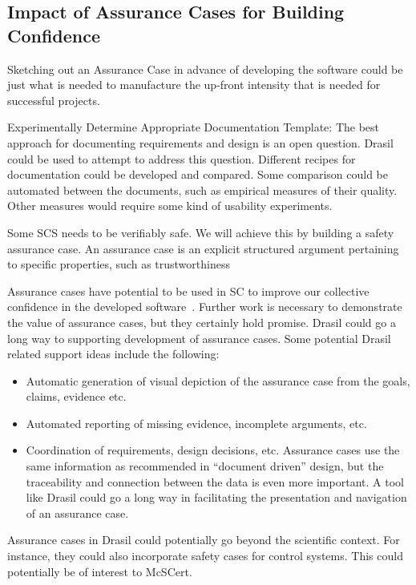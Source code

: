 \documentclass[12pt]{article}
\begin{document}
\subsection{Impact of Assurance Cases for Building
  Confidence} \label{SecAssuranceCase}

Sketching out an Assurance Case in advance of developing the software could be
just what is needed to manufacture the up-front intensity that is needed for
successful projects.

Experimentally Determine Appropriate Documentation Template: The best approach
for documenting requirements and design is an open question.  Drasil could be
used to attempt to address this question.  Different recipes for documentation
could be developed and compared.  Some comparison could be automated between the
documents, such as empirical measures of their quality.  Other measures would
require some kind of usability experiments.

Some SCS needs to be verifiably safe.  We will achieve this by building a safety
assurance case. An assurance case is an explicit structured argument pertaining
to specific properties, such as trustworthiness

Assurance cases have potential to be used in SC to improve our collective
confidence in the developed software~\cite{SmithEtAl2018_ICSEPoster}.  Further
work is necessary to demonstrate the value of assurance cases, but they
certainly hold promise.  Drasil could go a long way to supporting development of
assurance cases.  Some potential Drasil related support ideas include the
following:

\begin{itemize}
\item Automatic generation of visual depiction of the assurance case from the
  goals, claims, evidence etc.
\item Automated reporting of missing evidence, incomplete arguments, etc.
\item Coordination of requirements, design decisions, etc.  Assurance cases use
  the same information as recommended in ``document driven'' design, but the
  traceability and connection between the data is even more important.  A tool
  like Drasil could go a long way in facilitating the presentation and
  navigation of an assurance case.
\end{itemize}

Assurance cases in Drasil could potentially go beyond the scientific context.
For instance, they could also incorporate safety cases for
control systems.  This could potentially be of interest to McSCert.
\end{document}
